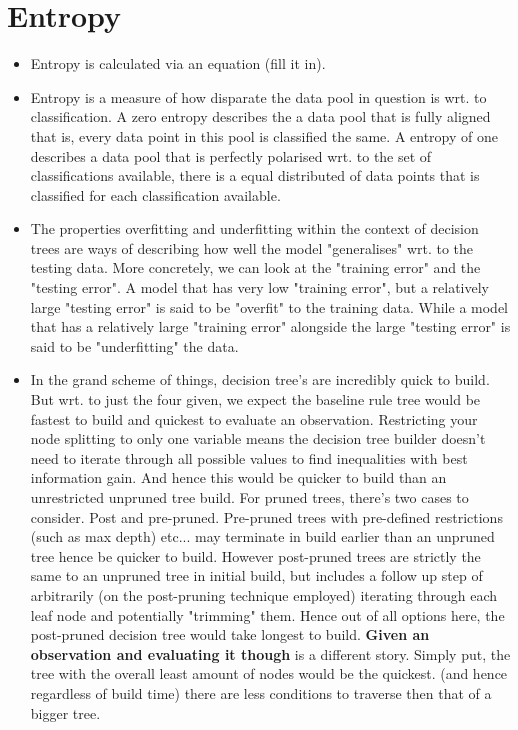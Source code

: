 \documentclass{article}
\begin{document}
\section{Entropy}
\begin{itemize}
	\item Entropy is calculated via an equation (fill it in).
	\item Entropy is a measure of how disparate the data pool in question is wrt. to classification. A zero entropy describes the a data pool that is fully aligned that is, every data point in this pool is classified the same. A entropy of one describes a data pool that is perfectly polarised wrt. to the set of classifications available, there is a equal distributed of data points that is classified for each classification available.
	\item The properties overfitting and underfitting within the context of decision trees are ways of describing how well the model "generalises" wrt. to the testing data. More concretely, we can look at the "training error" and the "testing error". A model that has very low "training error", but a relatively large "testing error" is said to be "overfit" to the training data. While a model that has a relatively large "training error" alongside the large "testing error" is said to be "underfitting" the data.
	\item In the grand scheme of things, decision tree's are incredibly quick to build. But wrt. to just the four given, we expect the baseline rule tree would be fastest to build and quickest to evaluate an observation. Restricting your node splitting to only one variable means the decision tree builder doesn't need to iterate through all possible values to find inequalities with best information gain. And hence this would be quicker to build than an unrestricted unpruned tree build. For pruned trees, there's two cases to consider. Post and pre-pruned. Pre-pruned trees with pre-defined restrictions (such as max depth) etc... may terminate in build earlier than an unpruned tree hence be quicker to build. However post-pruned trees are strictly the same to an unpruned tree in initial build, but includes a follow up step of arbitrarily (on the post-pruning technique employed) iterating through each leaf node and potentially "trimming" them. Hence out of all options here, the post-pruned decision tree would take longest to build.
		{\bf Given an observation and evaluating it though} is a different story. Simply put, the tree with the overall least amount of nodes would be the quickest. (and hence regardless of build time) there are less conditions to traverse then that of a bigger tree.

\end{itemize}
\end{document}
